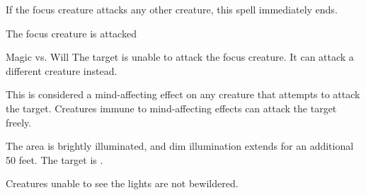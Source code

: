 \begin{comment}
\subsubsection{S}
\end{comment}

\begin{spellheader}
    \spellspecial If the focus creature attacks any other creature, this spell immediately ends.
\end{spellheader}
\begin{spelleffects}
    \begin{spelltrigger}{The focus creature is attacked}
        \begin{spellattack}{Magic vs. Will}
            \spellsuccess The target is unable to attack the focus creature. It can attack a different creature instead.
        \end{spellattack}
    \end{spelltrigger}

\end{spelleffects}
\begin{spellfooter}
    \spellnotes This is considered a mind-affecting effect on any creature that attempts to attack the target. Creatures immune to mind-affecting effects can attack the target freely.
\end{spellfooter}

\begin{spellheader}
    \spelldur{\durshort}
\end{spellheader}
\begin{spelleffects}
    \spelleffect The area is brightly illuminated, and dim illumination extends for an additional 50 feet.
    \spelleffect The target is \bewildered.
\end{spelleffects}
\begin{spellfooter}
    \spellnotes Creatures unable to see the lights are not bewildered.
\end{spellfooter}


